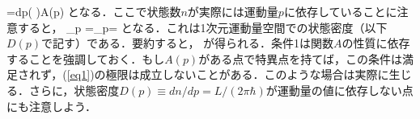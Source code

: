 =\int dp\left(
\right)A(p)
\ee
となる．ここで状態数$n$が実際には運動量$p$に依存していることに注意すると，
\be
	\equiv
	\lim_{\Delta p}
	=\lim_{\Delta p}=
\ee
となる．これは1次元運動量空間での状態密度（以下$D(p)$で記す）である．要約すると，
\be\label{eq1}
\ee
が得られる．条件\maru1は関数$A$の性質に依存することを強調しておく．もし$A(p)$がある点で特異点を持てば，この条件は満足されず，(\ref{eq1})の極限は成立しないことがある．このような場合は実際に生じる．さらに，状態密度$D(p)\equiv dn/dp=L/(2\pi\hbar)$が運動量の値に依存しない点にも注意しよう．









%
